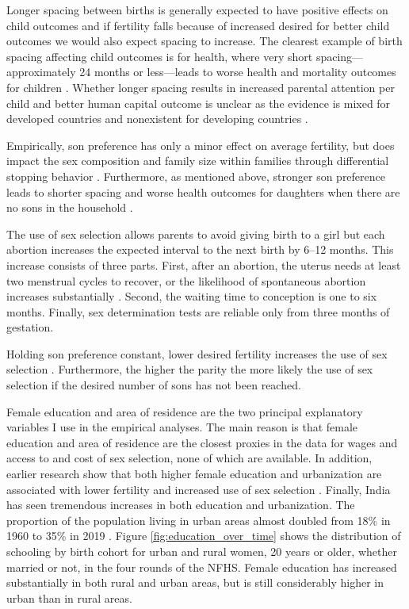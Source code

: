 Longer spacing between births is generally expected to have positive effects on 
child outcomes and if fertility falls because of increased desired for better child
outcomes we would also expect spacing to increase.
The clearest example of birth spacing affecting child outcomes is for health,
where very short spacing---approximately 24 months or less---leads to worse health 
and mortality outcomes for children 
\citep{Whitworth2002,Conde-Agudelo2006,Conde-Agudelo2012}.
Whether longer spacing results in increased parental attention per child and better 
human capital outcome is unclear as the evidence is mixed for developed countries and 
nonexistent for developing countries
\citep{Zajonc1975,Zajonc1976,Razin1980,Powell1993,Pettersson-Lidbom2009,Buckles2012,Barclay2017}.


Empirically, son preference has only a minor effect on average fertility, but does impact 
the sex composition and family size within families through differential stopping behavior 
\citet{repetto72,leung94,clark00,Basu2010,Barcellos2014}. 
Furthermore, as mentioned above, stronger son preference leads to shorter spacing and  
worse health outcomes for daughters when there are no sons in the household 
\citep{Whitworth2002,Bhalotra2008,Maitra2008,Jayachandran2011,Jayachandran2017a}.

The use of sex selection allows parents to avoid giving birth to a girl but each
abortion increases the expected interval to the next birth by 6--12 months.
This increase consists of three parts. 
First, after an abortion, the uterus needs at least two menstrual cycles to recover, 
or the likelihood of spontaneous abortion increases substantially \citep{zhou00b}. 
Second, the waiting time to conception is one to six months. 
Finally, sex determination tests are reliable only from three months of gestation. 

Holding son preference constant, lower desired fertility increases the use of sex 
selection \citep{Portner2015b,Jayachandran2017}.  
Furthermore, the higher the parity the more likely the use of sex selection if the 
desired number of sons has not been reached.


Female education and area of residence are the two principal explanatory variables I use
in the empirical analyses.
The main reason is that female education and area of residence are the closest proxies in 
the data for wages and access to and cost of sex selection, none of which are available.
In addition, earlier research show that both higher female education and urbanization are 
associated with lower fertility and increased use of sex selection 
\citep{das_gupta97,dreze01,bhat03,retherford03b,Guilmoto2009a,Portner2015b,Jayachandran2017}.
Finally, India has seen tremendous increases in both education and urbanization.
The proportion of the population living in urban areas almost doubled from 18\%
in 1960 to 35\% in 2019 \citep{United-Nations2019}.
Figure \ref{fig:education_over_time} shows the distribution of schooling by birth 
cohort for urban and rural women, 20 years or older, whether married or not, in the 
four rounds of the NFHS.
Female education has increased substantially in both rural and urban areas,
but is still considerably higher in urban than in rural areas.

